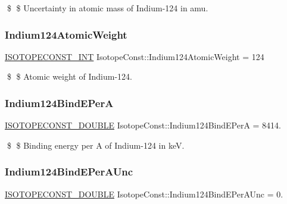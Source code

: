 \$ \$ Uncertainty in atomic mass of Indium-\/124 in amu. \mbox{\label{group___isotope_const-_indium-_in124_gad2b954841574cabd440fb039e745ce73}} 
\subsubsection{\texorpdfstring{Indium124\+Atomic\+Weight}{Indium124AtomicWeight}}
{\footnotesize\ttfamily \mbox{\hyperlink{group___isotope_const-_macros_ga5f18360b3e99483a35c32d789e62621c}{I\+S\+O\+T\+O\+P\+E\+C\+O\+N\+S\+T\+\_\+\+I\+NT}} Isotope\+Const\+::\+Indium124\+Atomic\+Weight = 124}

\$ \$ Atomic weight of Indium-\/124. \mbox{\label{group___isotope_const-_indium-_in124_ga511f05ce4ee0345b8927c725a96da2e2}} 
\subsubsection{\texorpdfstring{Indium124\+Bind\+E\+PerA}{Indium124BindEPerA}}
{\footnotesize\ttfamily \mbox{\hyperlink{group___isotope_const-_macros_ga8f45a7272ce02c0b4c65c44636ed719a}{I\+S\+O\+T\+O\+P\+E\+C\+O\+N\+S\+T\+\_\+\+D\+O\+U\+B\+LE}} Isotope\+Const\+::\+Indium124\+Bind\+E\+PerA = 8414.}

\$ \$ Binding energy per A of Indium-\/124 in keV. \mbox{\label{group___isotope_const-_indium-_in124_ga87d9ea6ecedc032e717579ed9a259447}} 
\subsubsection{\texorpdfstring{Indium124\+Bind\+E\+Per\+A\+Unc}{Indium124BindEPerAUnc}}
{\footnotesize\ttfamily \mbox{\hyperlink{group___isotope_const-_macros_ga8f45a7272ce02c0b4c65c44636ed719a}{I\+S\+O\+T\+O\+P\+E\+C\+O\+N\+S\+T\+\_\+\+D\+O\+U\+B\+LE}} Isotope\+Const\+::\+Indium124\+Bind\+E\+Per\+A\+Unc = 0.}

